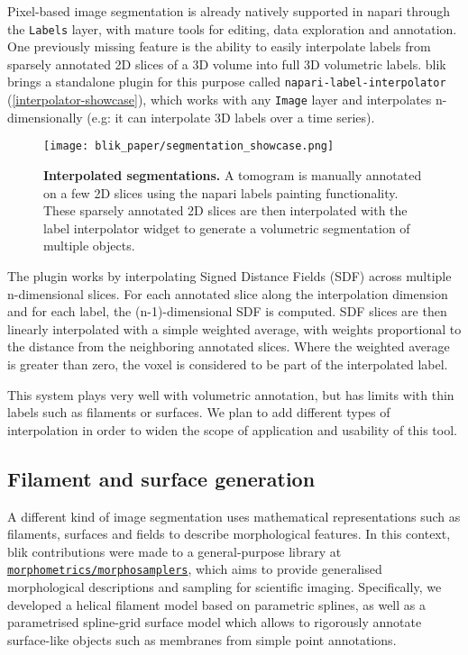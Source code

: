 Pixel-based image segmentation is already natively supported in napari through the \texttt{Labels} layer, with mature tools for editing, data exploration and annotation. One previously missing feature is the ability to easily interpolate labels from sparsely annotated 2D slices of a 3D volume into full 3D volumetric labels. blik brings a standalone plugin for this purpose called \texttt{napari-label-interpolator} (\autoref{interpolator-showcase}), which works with any \texttt{Image} layer and interpolates n-dimensionally (e.g: it can interpolate 3D labels over a time series).

\begin{figure}[!ht]
    \centering
    \texttt{[image: blik\_paper/segmentation\_showcase.png]}
    \caption[Interpolated segmentations]{\textbf{Interpolated segmentations.} A tomogram is manually annotated on a few 2D slices using the napari labels painting functionality. These sparsely annotated 2D slices are then interpolated with the label interpolator widget to generate a volumetric segmentation of multiple objects.}
    \label{interpolator-showcase}
\end{figure}

The plugin works by interpolating Signed Distance Fields (SDF) across multiple n-dimensional slices. For each annotated slice along the interpolation dimension and for each label, the (n-1)-dimensional SDF is computed. SDF slices are then linearly interpolated with a simple weighted average, with weights proportional to the distance from the neighboring annotated slices. Where the weighted average is greater than zero, the voxel is considered to be part of the interpolated label.

This system plays very well with volumetric annotation, but has limits with thin labels such as filaments or surfaces. We plan to add different types of interpolation in order to widen the scope of application and usability of this tool.

\subsection{Filament and surface generation}\label{filament-and-surface-generation}

A different kind of image segmentation uses mathematical representations such as filaments, surfaces and fields to describe morphological features. In this context, blik contributions were made to a general-purpose library at \href{https://github.com/morphometrics/morphosamplers}{\texttt{morphometrics\-/\-morphosamplers}}, which aims to provide generalised morphological descriptions and sampling for scientific imaging. Specifically, we developed a helical filament model based on parametric splines, as well as a parametrised spline-grid surface model which allows to rigorously annotate surface-like objects such as membranes from simple point annotations.

